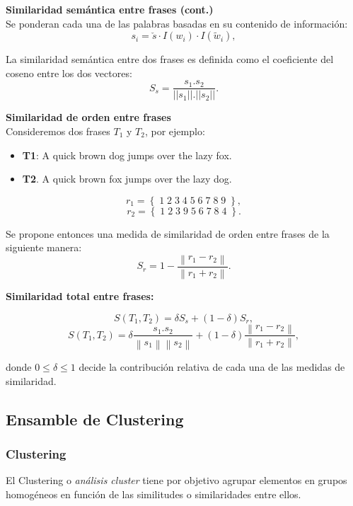 \begin{frame}[allowframebreaks]
	\framebreak
	\textbf{Similaridad semántica entre frases (cont.)} \\
	\bigskip
	Se ponderan cada una de las palabras basadas en su contenido de información:
	\[s_i = \check{s} \cdot I(w_i) \cdot I(\widetilde{w}_i),\]

	La similaridad semántica entre dos frases es definida como el coeficiente del coseno entre los dos vectores:
	\[S_s = \frac{s_1. s_2}{||s_1||.||s_2||}.\]

	\framebreak

	\textbf{Similaridad de orden entre frases} \\
	\bigskip
	Consideremos dos frases \(T_1\) y \(T_2\), por ejemplo:
	\begin{itemize}[<*>]
		\item \textbf{T1}: A quick brown dog jumps over the lazy fox.
		\item \textbf{T2}. A quick brown fox jumps over the lazy dog.
	\end{itemize}

	\[r_1 = \left \{\;1\;2\;3\;4\;5\;6\;7\;8\;9\;\right \},\]
	\[r_2 = \left \{\;1\;2\;3\;9\;5\;6\;7\;8\;4\;\right \}.\]

	Se propone entonces una medida de similaridad de orden entre frases de la siguiente manera:
	\[S_r = 1 - \frac{\left \| r_1 - r_2 \right \|}{\left \| r_1 + r_2 \right \|}.\]

	\framebreak

	\textbf{Similaridad total entre frases:} \\
	\bigskip

	\[S(T_1, T_2)=\delta S_s + (1 - \delta)S_r,\]
	\[S(T_1, T_2)=\delta \frac{s_1.s_2}{\left \| s_1 \right \|\left \| s_2 \right \|} + (1 - \delta)\frac{\left \|r_1-r_2 \right \|}{\left \| r_1+r_2 \right \|},\]

	\bigskip
	donde \(0 \leq \delta \leq 1\) decide la contribución relativa de cada una de las medidas de similaridad.
\end{frame}

\subsection{Ensamble de Clustering}
\begin{frame}
	\frametitle{Clustering}
	\begin{tcolorbox}[colback=blue!5,colframe=blue!40!black,title=Clustering]
		El Clustering o \textit{análisis cluster} tiene por objetivo agrupar elementos en grupos homogéneos en función de las similitudes o similaridades entre ellos.
	\end{tcolorbox}
\end{frame}

